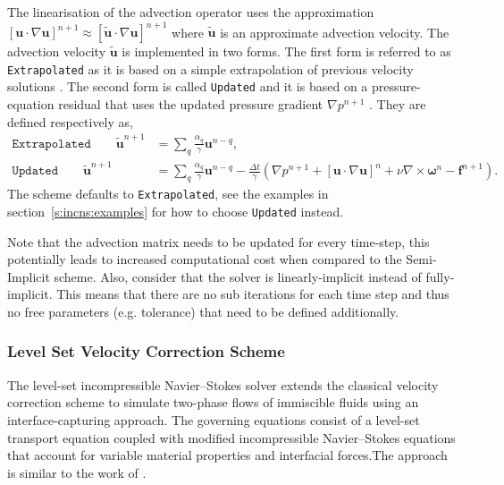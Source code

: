 The linearisation of the advection operator uses the 
approximation $[\mathbf{u} \cdot \nabla \mathbf{u}]^{n+1} \approx 
[\tilde{\mathbf{u}} \cdot \nabla \mathbf{u}]^{n+1}$ where $\tilde{\mathbf{u}}$
is an approximate advection velocity.
The advection velocity $\tilde{\mathbf{u}}$ is implemented in two forms.
The first form is referred to as \texttt{Extrapolated} as it is 
based on a simple extrapolation of previous velocity solutions \cite{Simo1994}.
The second form is called \texttt{Updated} and it is based on a 
pressure-equation residual that uses the updated pressure gradient $\nabla p^{n+1}$ \cite{Dong2010}.
They are defined respectively as,
\begin{align}
    \texttt{Extrapolated}\qquad\tilde{\mathbf{u}}^{n+1} &=
    \sum_q \frac{\alpha_q}{\gamma} \mathbf{u}^{n-q},\\
    \texttt{Updated}\qquad\tilde{\mathbf{u}}^{n+1} &=
    \sum_q \frac{\alpha_q}{\gamma} \mathbf{u}^{n-q} 
    - \frac{\Delta t}{\gamma} \left(
    \nabla p^{n+1}
    + [\mathbf{u} \cdot \nabla \mathbf{u}]^{n} 
    + \nu \nabla \times \mathbf{\omega}^{n}
    - \mathbf{f}^{n+1} \right).
\end{align}
The scheme defaults to \texttt{Extrapolated}, see 
the examples in section~\ref{s:incns:examples} for 
how to choose \texttt{Updated} instead.

Note that the advection matrix needs to be
updated for every time-step, this potentially leads to increased
computational cost when compared to the Semi-Implicit scheme.
Also, consider that the solver is linearly-implicit instead of fully-implicit.
This means that there are no sub iterations for each time step and 
thus no free parameters (e.g. tolerance) that need to be defined additionally.

\subsubsection{Level Set Velocity Correction Scheme}
\label{VCSLevelSet}
 The level-set incompressible Navier–Stokes solver extends the classical velocity correction scheme to simulate two-phase flows of immiscible fluids using an interface-capturing approach. The governing equations consist of a level-set transport equation coupled with modified incompressible Navier–Stokes equations that account for variable material properties and interfacial forces.The approach is similar to the work of \cite{Olsson2005Conservative}.


